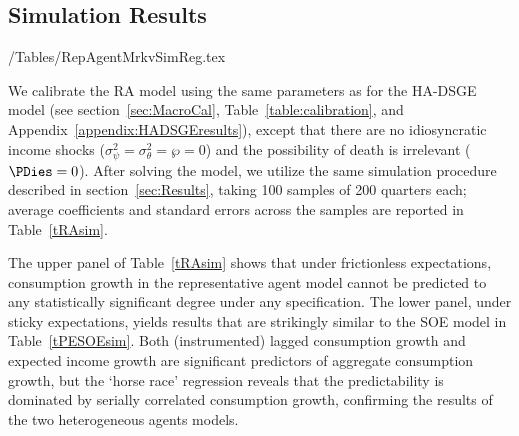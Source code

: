 \subsection{Simulation Results}

\econtexRoot/Tables/RepAgentMrkvSimReg.tex

We calibrate the RA model using the same parameters as for the
HA-DSGE model (see section~\ref{sec:MacroCal}, Table~\ref{table:calibration}, and Appendix~\ref{appendix:HADSGEresults}),
except that there are no idiosyncratic income shocks
($\sigma^2_\psi = \sigma^2_\theta = \wp = 0$) and the possibility
of death is irrelevant ($\PDies=0$).  After solving the model, we
utilize the same simulation procedure described in section~\ref{sec:Results},
taking 100 samples of 200 quarters each; average coefficients
and standard errors across the samples are reported in Table~\ref{tRAsim}.

The upper panel of Table~\ref{tRAsim} shows that under frictionless
expectations, consumption growth in the representative agent model
cannot be predicted to any statistically significant degree under any
specification.  The lower panel, under sticky expectations, yields
results that are strikingly similar to the SOE model in Table~\ref{tPESOEsim}.
Both (instrumented) lagged consumption growth and expected income
growth are significant predictors of aggregate consumption growth,
but the `horse race' regression reveals that the predictability is
dominated by serially correlated consumption growth, confirming the
results of the two heterogeneous agents models.
